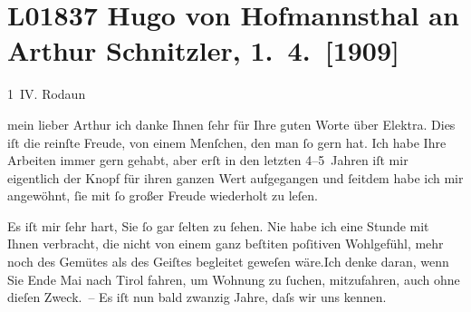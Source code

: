 

\section[Hugo von Hofmannsthal an Arthur Schnitzler, 1. 4. {[}1909{]}]{L01837 Hugo von Hofmannsthal an Arthur Schnitzler, 1. 4. {[}1909{]}}
\nopagebreak{}
\rehead{ }\normalsize\beginnumbering{}
\toendnotes[C]{\smallbreak\pagebreak[2]}
\toendnotes[C]{\smallbreak}
\pstart
           \raggedleft{}{\pb}1 IV.{ }Rodaun\pend
           
\pstart{}mein lieber Arthur\pend\vspace{0.5em}
\pstart
           ich danke Ihnen ſehr für Ihre guten Worte über Elektra. Dies iſt die reinſte Freude, von einem Menſchen, den man ſo gern
               hat. Ich habe Ihre Arbeiten immer gern gehabt, aber erſt in den letzten 4–5 Jahren
               iſt mir eigentlich der Knopf für ihren ganzen Wert aufgegangen {\pb}und ſeitdem habe ich mir
               angewöhnt, ſie mit ſo großer Freude wiederholt zu leſen.\pend
           
\pstart
           Es iſt mir ſehr hart, Sie ſo gar ſelten zu ſehen. Nie habe ich eine Stunde mit Ihnen
               verbracht, die nicht von einem ganz beſti{\geminationm}ten poſitiven
               Wohlgefühl, mehr noch des Gemütes als des Geiſtes begleitet geweſen wäre.\hspace*{1.5em}Ich denke daran, {\pb}wenn Sie Ende Mai
               nach Tirol fahren, um Wohnung zu ſuchen,
               mitzufahren, auch ohne dieſen Zweck. – Es iſt nun bald zwanzig Jahre, daſs wir uns
               kennen.\pend
           
